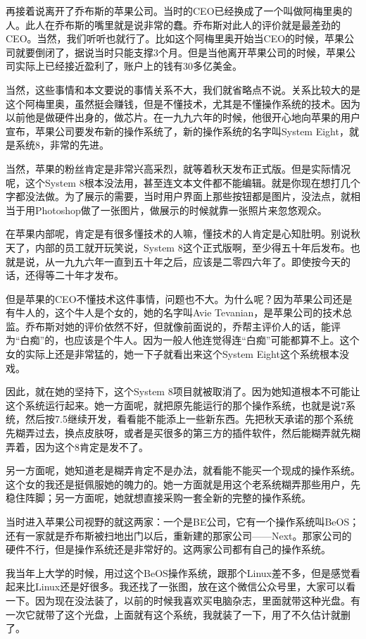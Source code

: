 \documentclass[
  letterpaper,
  DIV=11,
  numbers=noendperiod]{scrreprt}
\begin{document}
再接着说离开了乔布斯的苹果公司。当时的CEO已经换成了一个叫做阿梅里奥的人。此人在乔布斯的嘴里就是说非常的蠢。乔布斯对此人的评价就是最差劲的CEO。当然，我们听听也就行了。比如这个阿梅里奥开始当CEO的时候，苹果公司就要倒闭了，据说当时只能支撑3个月。但是当他离开苹果公司的时候，苹果公司实际上已经接近盈利了，账户上的钱有30多亿美金。

当然，这些事情和本文要说的事情关系不大，我们就省略点不说。关系比较大的是这个阿梅里奥，虽然挺会赚钱，但是不懂技术，尤其是不懂操作系统的技术。因为以前他是做硬件出身的，做芯片。在一九九六年的时候，他很开心地向苹果的用户宣布，苹果公司要发布新的操作系统了，新的操作系统的名字叫System
Eight，就是系统8，非常的先进。

当然，苹果的粉丝肯定是非常兴高采烈，就等着秋天发布正式版。但是实际情况呢，这个System
8根本没法用，甚至连文本文件都不能编辑。就是你现在想打几个字都没法做。为了展示的需要，当时用户界面上那些按钮都是图片，没法点，就相当于用Photoshop做了一张图片，做展示的时候就靠一张照片来忽悠观众。

在苹果内部呢，肯定是有很多懂技术的人嘛，懂技术的人肯定是心知肚明。别说秋天了，内部的员工就开玩笑说，System
8这个正式版啊，至少得五十年后发布。也就是说，从一九九六年一直到五十年之后，应该是二零四六年了。即使按今天的话，还得等二十年才发布。

但是苹果的CEO不懂技术这件事情，问题也不大。为什么呢？因为苹果公司还是有牛人的，这个牛人是个女的，她的名字叫Avie
Tevanian，是苹果公司的技术总监。乔布斯对她的评价依然不好，但就像前面说的，乔帮主评价人的话，能评为``白痴''的，也应该是个牛人。因为一般人他连觉得连``白痴''可能都算不上。这个女的实际上还是非常猛的，她一下子就看出来这个System
Eight这个系统根本没戏。

因此，就在她的坚持下，这个System
8项目就被取消了。因为她知道根本不可能让这个系统运行起来。她一方面呢，就把原先能运行的那个操作系统，也就是说7系统，然后按7.5继续开发，看看能不能添上一些新东西。先把秋天承诺的那个系统先糊弄过去，换点皮肤呀，或者是买很多的第三方的插件软件，然后能糊弄就先糊弄着，因为这个8肯定是发不了。

另一方面呢，她知道老是糊弄肯定不是办法，就看能不能买一个现成的操作系统。这个女的我还是挺佩服她的魄力的。她一方面就是用这个老系统糊弄那些用户，先稳住阵脚；另一方面呢，她就想直接采购一套全新的完整的操作系统。

当时进入苹果公司视野的就这两家：一个是BE公司，它有一个操作系统叫BeOS；还有一家就是乔布斯被扫地出门以后，重新建的那家公司------Next。那家公司的硬件不行，但是操作系统还是非常好的。这两家公司都有自己的操作系统。

我当年上大学的时候，用过这个BeOS操作系统，跟那个Linux差不多，但是感觉看起来比Linux还是好很多。我还找了一张图，放在这个微信公众号里，大家可以看一下。因为现在没法装了，以前的时候我喜欢买电脑杂志，里面就带这种光盘。有一次它就带了这个光盘，上面就有这个系统，我就装了一下，用了不久估计就删了。
\end{document}
